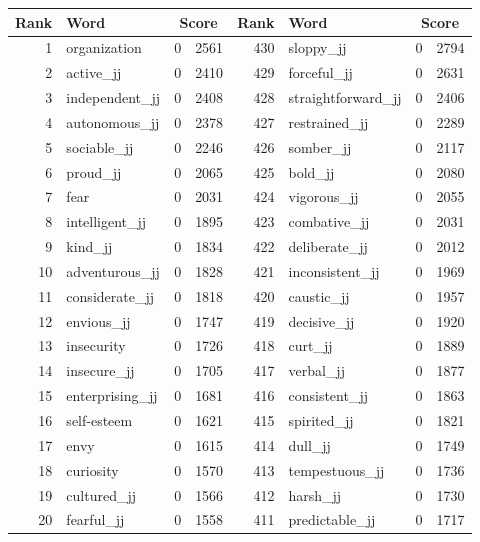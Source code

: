 \begin{table}[tbp]
    \begin{tabular}{| rlr@{.}l | rlr@{.}l |}
    \hline
    \textbf{Rank} & \textbf{Word} & \multicolumn{2}{c|}{\textbf{Score}} & \textbf{Rank} & \textbf{Word} & \multicolumn{2}{c|}{\textbf{Score}} \\
    \hline
    1 & organization & 0 & 2561    &    430 & sloppy\_jj & 0 & 2794 \\
    2 & active\_jj & 0 & 2410    &    429 & forceful\_jj & 0 & 2631 \\
    3 & independent\_jj & 0 & 2408    &    428 & straightforward\_jj & 0 & 2406 \\
    4 & autonomous\_jj & 0 & 2378    &    427 & restrained\_jj & 0 & 2289 \\
    5 & sociable\_jj & 0 & 2246    &    426 & somber\_jj & 0 & 2117 \\
    6 & proud\_jj & 0 & 2065    &    425 & bold\_jj & 0 & 2080 \\
    7 & fear & 0 & 2031    &    424 & vigorous\_jj & 0 & 2055 \\
    8 & intelligent\_jj & 0 & 1895    &    423 & combative\_jj & 0 & 2031 \\
    9 & kind\_jj & 0 & 1834    &    422 & deliberate\_jj & 0 & 2012 \\
    10 & adventurous\_jj & 0 & 1828    &    421 & inconsistent\_jj & 0 & 1969 \\
    11 & considerate\_jj & 0 & 1818    &    420 & caustic\_jj & 0 & 1957 \\
    12 & envious\_jj & 0 & 1747    &    419 & decisive\_jj & 0 & 1920 \\
    13 & insecurity & 0 & 1726    &    418 & curt\_jj & 0 & 1889 \\
    14 & insecure\_jj & 0 & 1705    &    417 & verbal\_jj & 0 & 1877 \\
    15 & enterprising\_jj & 0 & 1681    &    416 & consistent\_jj & 0 & 1863 \\
    16 & self-esteem & 0 & 1621    &    415 & spirited\_jj & 0 & 1821 \\
    17 & envy & 0 & 1615    &    414 & dull\_jj & 0 & 1749 \\
    18 & curiosity & 0 & 1570    &    413 & tempestuous\_jj & 0 & 1736 \\
    19 & cultured\_jj & 0 & 1566    &    412 & harsh\_jj & 0 & 1730 \\
    20 & fearful\_jj & 0 & 1558    &    411 & predictable\_jj & 0 & 1717 \\

\end{tabular}
\end{table}
